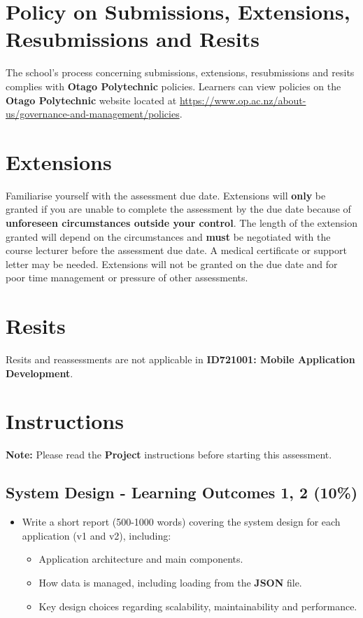 \documentclass{article}
\begin{document}
\section*{Policy on Submissions, Extensions, Resubmissions and Resits}
The school's process concerning submissions, extensions, resubmissions and resits complies with \textbf{Otago Polytechnic} policies. Learners can view policies on the \textbf{Otago Polytechnic} website located at \href{https://www.op.ac.nz/about-us/governance-and-management/policies}{https://www.op.ac.nz/about-us/governance-and-management/policies}. 

\section*{Extensions}
Familiarise yourself with the assessment due date. Extensions will \textbf{only} be granted if you are unable to complete the assessment by the due date because of \textbf{unforeseen circumstances outside your control}. The length of the extension granted will depend on the circumstances and \textbf{must} be negotiated with the course lecturer before the assessment due date. A medical certificate or support letter may be needed. Extensions will not be granted on the due date and for poor time management or pressure of other assessments.

\section*{Resits}
Resits and reassessments are not applicable in \textbf{ID721001: Mobile Application Development}.

\section*{Instructions}

\textbf{Note:} Please read the \textbf{Project} instructions before starting this assessment. 

\subsection*{System Design - Learning Outcomes 1, 2 (10\%)}
\begin{itemize}
  \item Write a short report (500-1000 words) covering the system design for each application (v1 and v2), including:
  \begin{itemize}
    \item Application architecture and main components.
    \item How data is managed, including loading from the \textbf{JSON} file.
    \item Key design choices regarding scalability, maintainability and performance.
  \end{itemize}
\end{itemize}
\end{document}
